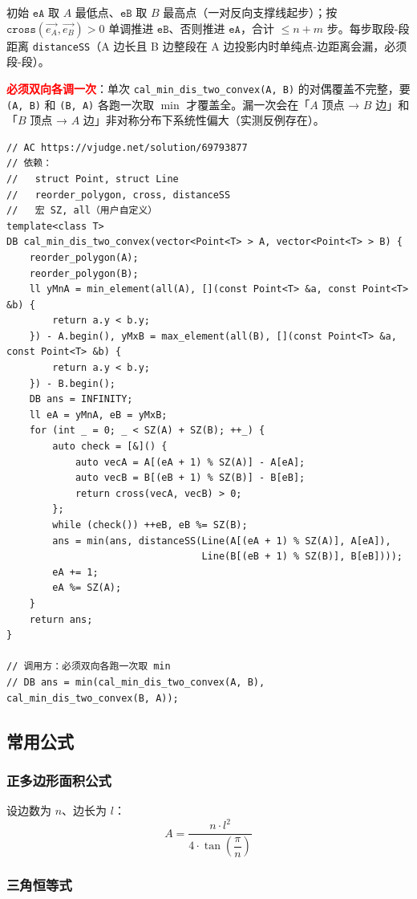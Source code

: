 		初始 $\texttt{eA}$ 取 $A$ 最低点、$\texttt{eB}$ 取 $B$ 最高点（一对反向支撑线起步）；按 $\texttt{cross}(\vec{e_A}, \vec{e_B}) > 0$ 单调推进 $\texttt{eB}$、否则推进 $\texttt{eA}$，合计 $\le n + m$ 步。每步取段-段距离 \texttt{distanceSS}（A 边长且 B 边整段在 A 边投影内时单纯点-边距离会漏，必须段-段）。

		\textcolor{red}{\textbf{必须双向各调一次}}：单次 \texttt{cal\_min\_dis\_two\_convex(A, B)} 的对偶覆盖不完整，要 \texttt{(A, B)} 和 \texttt{(B, A)} 各跑一次取 $\min$ 才覆盖全。漏一次会在「$A$ 顶点 → $B$ 边」和「$B$ 顶点 → $A$ 边」非对称分布下系统性偏大（实测反例存在）。

		\begin{verbatim}
// AC https://vjudge.net/solution/69793877
// 依赖：
//   struct Point, struct Line
//   reorder_polygon, cross, distanceSS
//   宏 SZ, all（用户自定义）
template<class T>
DB cal_min_dis_two_convex(vector<Point<T> > A, vector<Point<T> > B) {
	reorder_polygon(A);
	reorder_polygon(B);
	ll yMnA = min_element(all(A), [](const Point<T> &a, const Point<T> &b) {
		return a.y < b.y;
	}) - A.begin(), yMxB = max_element(all(B), [](const Point<T> &a, const Point<T> &b) {
		return a.y < b.y;
	}) - B.begin();
	DB ans = INFINITY;
	ll eA = yMnA, eB = yMxB;
	for (int _ = 0; _ < SZ(A) + SZ(B); ++_) {
		auto check = [&]() {
			auto vecA = A[(eA + 1) % SZ(A)] - A[eA];
			auto vecB = B[(eB + 1) % SZ(B)] - B[eB];
			return cross(vecA, vecB) > 0;
		};
		while (check()) ++eB, eB %= SZ(B);
		ans = min(ans, distanceSS(Line(A[(eA + 1) % SZ(A)], A[eA]),
								  Line(B[(eB + 1) % SZ(B)], B[eB])));
		eA += 1;
		eA %= SZ(A);
	}
	return ans;
}

// 调用方：必须双向各跑一次取 min
// DB ans = min(cal_min_dis_two_convex(A, B), cal_min_dis_two_convex(B, A));
		\end{verbatim}

	\newpage

	\subsection{常用公式}

	\subsubsection{正多边形面积公式}

	设边数为 $n$、边长为 $l$：
	$$
	A = \dfrac{n \cdot l^2}{4 \cdot \tan\!\left(\dfrac{\pi}{n}\right)}
	$$

	\subsubsection{三角恒等式}

